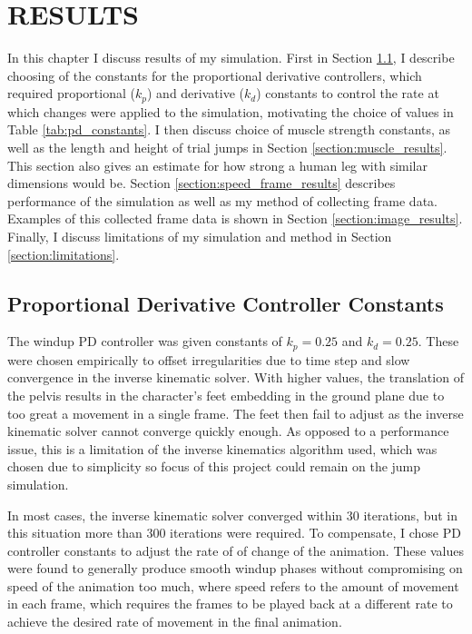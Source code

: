 
 
\chapter{RESULTS}
\label{chapter:results}
In this chapter I discuss results of my simulation.  First in Section \ref{section:pd_constants_results}, I describe choosing of the constants for the proportional derivative controllers, which required proportional ($k_p$) and derivative ($k_d$) constants to control the rate at which changes were applied to the simulation, motivating the choice of values in Table \ref{tab:pd_constants}.  I then discuss choice of muscle strength constants, as well as the length and height of trial jumps in Section \ref{section:muscle_results}.  This section also gives an estimate for how strong a human leg with similar dimensions would be.  Section \ref{section:speed_frame_results} describes performance of the simulation as well as my method of collecting frame data.  Examples of this collected frame data is shown in Section \ref{section:image_results}.  Finally, I discuss limitations of my simulation and method in Section \ref{section:limitations}.

\section{Proportional Derivative Controller Constants}
\label{section:pd_constants_results}
The windup PD controller was given constants of $k_p = 0.25$ and $k_d = 0.25$.  These were chosen empirically to offset irregularities due to time step and slow convergence in the inverse kinematic solver.  With higher values, the translation of the pelvis results in the character's feet embedding in the ground plane due to too great a movement in a single frame.  The feet then fail to adjust as the inverse kinematic solver cannot converge quickly enough.  As opposed to a performance issue, this is a limitation of the inverse kinematics algorithm used, which was chosen due to simplicity so focus of this project could remain on the jump simulation.  

In most cases, the inverse kinematic solver converged within 30 iterations, but in this situation more than 300 iterations were required.  To compensate, I chose PD controller constants to adjust the rate of of change of the animation.  These values were found to generally produce smooth windup phases without compromising on speed of the animation too much, where speed refers to the amount of movement in each frame, which requires the frames to be played back at a different rate to achieve the desired rate of movement in the final animation.

